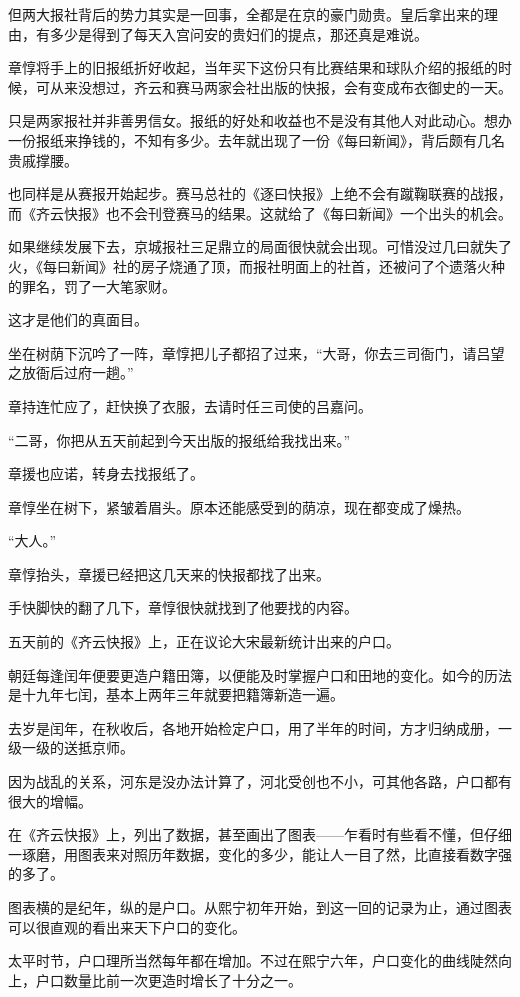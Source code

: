 但两大报社背后的势力其实是一回事，全都是在京的豪门勋贵。皇后拿出来的理由，有多少是得到了每天入宫问安的贵妇们的提点，那还真是难说。

章惇将手上的旧报纸折好收起，当年买下这份只有比赛结果和球队介绍的报纸的时候，可从来没想过，齐云和赛马两家会社出版的快报，会有变成布衣御史的一天。

只是两家报社并非善男信女。报纸的好处和收益也不是没有其他人对此动心。想办一份报纸来挣钱的，不知有多少。去年就出现了一份《每曰新闻》，背后颇有几名贵戚撑腰。

也同样是从赛报开始起步。赛马总社的《逐曰快报》上绝不会有蹴鞠联赛的战报，而《齐云快报》也不会刊登赛马的结果。这就给了《每曰新闻》一个出头的机会。

如果继续发展下去，京城报社三足鼎立的局面很快就会出现。可惜没过几曰就失了火，《每曰新闻》社的房子烧通了顶，而报社明面上的社首，还被问了个遗落火种的罪名，罚了一大笔家财。

这才是他们的真面目。

坐在树荫下沉吟了一阵，章惇把儿子都招了过来，“大哥，你去三司衙门，请吕望之放衙后过府一趟。”

章持连忙应了，赶快换了衣服，去请时任三司使的吕嘉问。

“二哥，你把从五天前起到今天出版的报纸给我找出来。”

章援也应诺，转身去找报纸了。

章惇坐在树下，紧皱着眉头。原本还能感受到的荫凉，现在都变成了燥热。

“大人。”

章惇抬头，章援已经把这几天来的快报都找了出来。

手快脚快的翻了几下，章惇很快就找到了他要找的内容。

五天前的《齐云快报》上，正在议论大宋最新统计出来的户口。

朝廷每逢闰年便要更造户籍田簿，以便能及时掌握户口和田地的变化。如今的历法是十九年七闰，基本上两年三年就要把籍簿新造一遍。

去岁是闰年，在秋收后，各地开始检定户口，用了半年的时间，方才归纳成册，一级一级的送抵京师。

因为战乱的关系，河东是没办法计算了，河北受创也不小，可其他各路，户口都有很大的增幅。

在《齐云快报》上，列出了数据，甚至画出了图表——乍看时有些看不懂，但仔细一琢磨，用图表来对照历年数据，变化的多少，能让人一目了然，比直接看数字强的多了。

图表横的是纪年，纵的是户口。从熙宁初年开始，到这一回的记录为止，通过图表可以很直观的看出来天下户口的变化。

太平时节，户口理所当然每年都在增加。不过在熙宁六年，户口变化的曲线陡然向上，户口数量比前一次更造时增长了十分之一。

